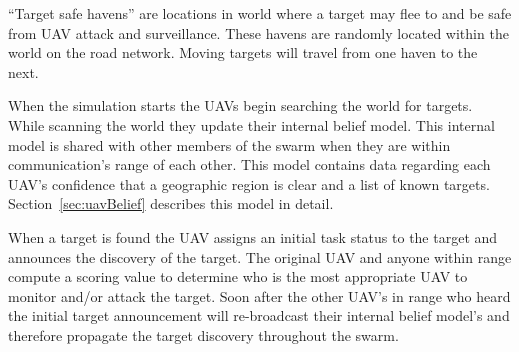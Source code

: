 ``Target safe havens'' are locations in world where a target may flee to and be safe from UAV attack and surveillance.  These havens are randomly located within the world on the road network.  Moving targets will travel from one haven to the next.

When the simulation starts the UAVs begin searching the world for targets.  While scanning the world they update their internal belief model.  This internal model is shared with other members of the swarm when they are within communication's range of each other.  This model contains data regarding each UAV's confidence that a geographic region is clear and a list of known targets.  Section~\ref{sec:uavBelief} describes this model in detail.

When a target is found the UAV assigns an initial task status to the target and announces the discovery of the target.  The original UAV and anyone within range compute a scoring value to determine who is the most appropriate UAV to monitor and/or attack the target.  Soon after the other UAV's in range who heard the initial target announcement will re-broadcast their internal belief model's and therefore propagate the target discovery throughout the swarm.


